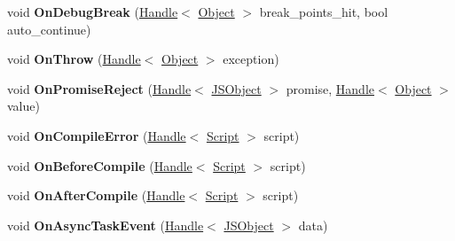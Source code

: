 \begin{DoxyCompactItemize}
\item 
void {\bfseries On\+Debug\+Break} (\hyperlink{classv8_1_1internal_1_1_handle}{Handle}$<$ \hyperlink{classv8_1_1internal_1_1_object}{Object} $>$ break\+\_\+points\+\_\+hit, bool auto\+\_\+continue)\hypertarget{classv8_1_1internal_1_1_debug_a9ce419d2374da2fe084aa95de446e941}{}\label{classv8_1_1internal_1_1_debug_a9ce419d2374da2fe084aa95de446e941}

\item 
void {\bfseries On\+Throw} (\hyperlink{classv8_1_1internal_1_1_handle}{Handle}$<$ \hyperlink{classv8_1_1internal_1_1_object}{Object} $>$ exception)\hypertarget{classv8_1_1internal_1_1_debug_ab1394c52b67e43ccea0f0844324a5336}{}\label{classv8_1_1internal_1_1_debug_ab1394c52b67e43ccea0f0844324a5336}

\item 
void {\bfseries On\+Promise\+Reject} (\hyperlink{classv8_1_1internal_1_1_handle}{Handle}$<$ \hyperlink{classv8_1_1internal_1_1_j_s_object}{J\+S\+Object} $>$ promise, \hyperlink{classv8_1_1internal_1_1_handle}{Handle}$<$ \hyperlink{classv8_1_1internal_1_1_object}{Object} $>$ value)\hypertarget{classv8_1_1internal_1_1_debug_ac82385427ea17ba4d1e910a57cf1a7c8}{}\label{classv8_1_1internal_1_1_debug_ac82385427ea17ba4d1e910a57cf1a7c8}

\item 
void {\bfseries On\+Compile\+Error} (\hyperlink{classv8_1_1internal_1_1_handle}{Handle}$<$ \hyperlink{classv8_1_1internal_1_1_script}{Script} $>$ script)\hypertarget{classv8_1_1internal_1_1_debug_a9ac90b1fd7b555a797c838f97e083ea6}{}\label{classv8_1_1internal_1_1_debug_a9ac90b1fd7b555a797c838f97e083ea6}

\item 
void {\bfseries On\+Before\+Compile} (\hyperlink{classv8_1_1internal_1_1_handle}{Handle}$<$ \hyperlink{classv8_1_1internal_1_1_script}{Script} $>$ script)\hypertarget{classv8_1_1internal_1_1_debug_abecd206e99e0880cee0053a839deaf3e}{}\label{classv8_1_1internal_1_1_debug_abecd206e99e0880cee0053a839deaf3e}

\item 
void {\bfseries On\+After\+Compile} (\hyperlink{classv8_1_1internal_1_1_handle}{Handle}$<$ \hyperlink{classv8_1_1internal_1_1_script}{Script} $>$ script)\hypertarget{classv8_1_1internal_1_1_debug_a93c2f89ac79abb686b6d3ee02074339d}{}\label{classv8_1_1internal_1_1_debug_a93c2f89ac79abb686b6d3ee02074339d}

\item 
void {\bfseries On\+Async\+Task\+Event} (\hyperlink{classv8_1_1internal_1_1_handle}{Handle}$<$ \hyperlink{classv8_1_1internal_1_1_j_s_object}{J\+S\+Object} $>$ data)\hypertarget{classv8_1_1internal_1_1_debug_a3cfb85d71cae2e42513bcf539d303a74}{}\label{classv8_1_1internal_1_1_debug_a3cfb85d71cae2e42513bcf539d303a74}


\end{DoxyCompactItemize}
